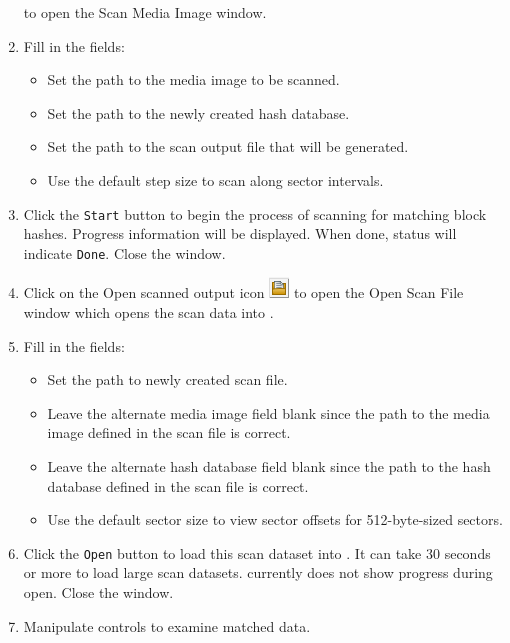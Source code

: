 \documentclass[11pt,fleqn]{article} %
\begin{document}
\begin{enumerate}
to open the \sscope Scan Media Image window.
\item Fill in the fields:
  \begin{itemize}
  \item Set the path to the media image to be scanned.
  \item Set the path to the newly created hash database.
  \item Set the path to the scan output file that will be generated.
  \item Use the default step size to scan along sector intervals.
  \end{itemize}
\item Click the \verb+Start+ button to begin the process of scanning for matching block hashes. Progress information will be displayed. When done, status will indicate \verb+Done+. Close the window.
\item Click on the Open scanned output icon
\includegraphics[scale=.4]{screenshots/open_scanned_output_icon}
to open the Open Scan File window which opens the scan data into \sscope.
\item Fill in the fields:
  \begin{itemize}
  \item Set the path to newly created scan file.
  \item Leave the alternate media image field blank since the path to the media image defined in the scan file is correct.
  \item Leave the alternate hash database field blank since the path to the hash database defined in the scan file is correct.
  \item Use the default sector size to view sector offsets for 512-byte-sized sectors.
  \end{itemize}
\item Click the \verb+Open+ button to load this scan dataset into \sscope. It can take 30 seconds or more to load large scan datasets. \sscope currently does not show progress during open. Close the window.
\item Manipulate \sscope controls to examine matched data.
\end{enumerate}
\end{document}
